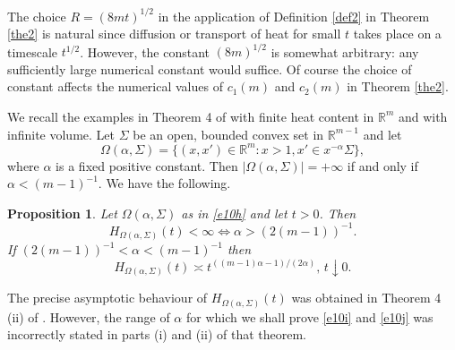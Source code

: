\documentclass[a4paper,9pt]{amsart}
\newtheorem{proposition}[theorem]{Proposition}
\begin{document}
The choice $R=(8mt)^{1/2}$ in the application of Definition
\ref{def2} in Theorem \ref{the2} is natural since diffusion or
transport of heat for small $t$ takes place on a timescale
$t^{1/2}$. However, the constant $(8m)^{1/2}$ is somewhat
arbitrary: any sufficiently large numerical constant would
suffice. Of course the choice of constant affects the numerical
values of $c_1(m)$ and $c_2(m)$ in Theorem \ref{the2}.

We recall the examples in Theorem 4 of \cite
{mvdB13} with finite heat content in ${\mathbb{R}}^m$ and with infinite volume.
Let $\Sigma$ be an open, bounded convex set in ${\mathbb{R}}^{m-1}$ and let
\begin{equation}\label{e10h}
\Omega(\alpha, \Sigma)=\{(x,x')\in {\mathbb{R}}^m:x>1, x'\in
x^{-\alpha}\Sigma\},
\end{equation}
where $\alpha$ is a fixed positive constant. Then $|\Omega(\alpha,
\Sigma)|=+\infty$ if and only if $\alpha<(m-1)^{-1}$. We have the
following.
\begin{proposition}\label{prop} Let $\Omega(\alpha, \Sigma)$ as in \eqref{e10h}
and let $t>0$. Then
\begin{equation}\label{e10i}
H_{\Omega(\alpha, \Sigma)}(t)<\infty
\Leftrightarrow\alpha>(2(m-1))^{-1}.
\end{equation}
If $(2(m-1))^{-1}<\alpha<(m-1)^{-1}$ then
\begin{equation}\label{e10j}
H_{\Omega(\alpha, \Sigma)}(t)\asymp t^{((m-1)\alpha-1)/(2\alpha)},
 \, t\downarrow 0.
\end{equation}
\end{proposition} The precise asymptotic behaviour of $H_{\Omega(\alpha,
\Sigma)}(t)$ was obtained in Theorem 4 (ii) of \cite{mvdB13}.
However, the range of $\alpha$ for which we shall prove
\eqref{e10i} and \eqref{e10j} was incorrectly stated in parts (i)
and (ii) of that theorem.
\end{document}
